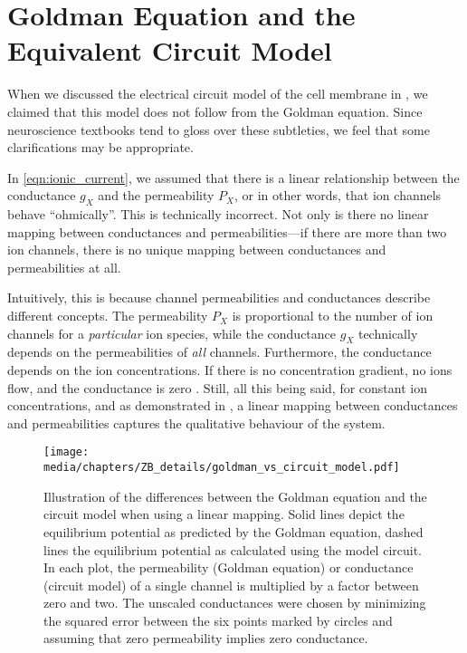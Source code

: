 
\section{Goldman Equation and the Equivalent Circuit Model}
\label{app:goldman_equiv_circuit_diff}

When we discussed the electrical circuit model of the cell membrane in , we claimed that this model does not follow from the Goldman equation.
Since neuroscience textbooks tend to gloss over these subtleties, we feel that some clarifications may be appropriate.

In \cref{eqn:ionic_current}, we assumed that there is a linear relationship between the conductance $g_X$ and the permeability $P_X$, or in other words, that ion channels behave \enquote{ohmically}.
This is technically incorrect.
Not only is there no linear mapping between conductances and permeabilities---if there are more than two ion channels, there is no unique mapping between conductances and permeabilities at all.

Intuitively, this is because channel permeabilities and conductances describe different concepts.
The permeability $P_X$ is proportional to the number of ion channels for a \emph{particular} ion species, while the conductance $g_X$ technically depends on the permeabilities of \emph{all} channels.
Furthermore, the conductance depends on the ion concentrations.
If there is no concentration gradient, no ions flow, and the conductance is zero \citep{enderle2011bioelectric}.
Still, all this being said, for constant ion concentrations, and as demonstrated in , a linear mapping between conductances and permeabilities captures the qualitative behaviour of the system.

\begin{figure}
	\centering
	\texttt{[image: media/chapters/ZB\_details/goldman\_vs\_circuit\_model.pdf]}
	\caption[Differences between the Goldman equation and the circuit model]{Illustration of the differences between the Goldman equation and the circuit model when using a linear mapping. Solid lines depict the equilibrium potential as predicted by the Goldman equation, dashed lines the equilibrium potential as calculated using the model circuit. In each plot, the permeability (Goldman equation) or conductance (circuit model) of a single channel is multiplied by a factor between zero and two. The unscaled conductances were chosen by minimizing the squared error between the six points marked by circles and assuming that zero permeability implies zero conductance.}
	\label{fig:goldman_vs_circuit_model}
\end{figure}

